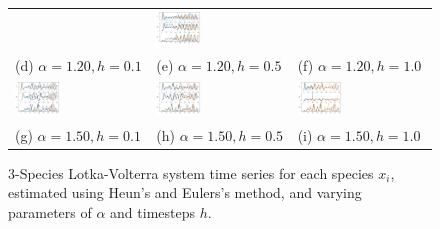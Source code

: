 \documentclass[11pt, oneside]{article}   	%
\begin{document}
\begin{figure}[h!]
\begin{tabular}{lll}
			&
			\hspace{-5mm}\includegraphics[width=0.35\textwidth]{figs/3SpeciesApprox120_10.pdf}\vspace{-3mm}
			\\
			{\scriptsize \hspace{4mm}(d) $\alpha = 1.20, h=0.1$}&
			{\scriptsize \hspace{4mm}(e) $\alpha = 1.20, h=0.5$}&
			{\scriptsize \hspace{4mm}(f) $\alpha = 1.20, h=1.0$}
			\\
			\includegraphics[width=0.35\textwidth]{figs/3SpeciesApprox150_1.pdf}
			&
			\hspace{-5mm}\includegraphics[width=0.35\textwidth]{figs/3SpeciesApprox150_5.pdf}
			&
			\hspace{-5mm}\includegraphics[width=0.35\textwidth]{figs/3SpeciesApprox150_10.pdf}\vspace{-3mm}
			\\
			{\scriptsize \hspace{4mm}(g) $\alpha = 1.50, h=0.1$}&
			{\scriptsize \hspace{4mm}(h) $\alpha = 1.50, h=0.5$}&
			{\scriptsize \hspace{4mm}(i) $\alpha = 1.50, h=1.0$}
		\end{tabular}
		\caption{3-Species Lotka-Volterra system time series for each species $x_i$, estimated using Heun's and Eulers's method, and varying parameters of $\alpha$ and timesteps $h$.}
		\label{9_Lotka-Volterra_plots}
	\end{figure}
\end{document}
